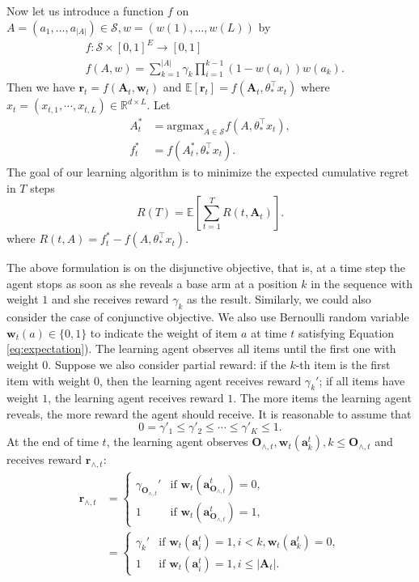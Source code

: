 \documentclass{article}
\newcommand{\EE}{\mathbb{E}}
\newcommand{\RR}{\mathbb{R}}
\newcommand{\bA}{\mathbf{A}}
\newcommand{\ba}{\mathbf{a}}
\newcommand{\bO}{\mathbf{O}}
\newcommand{\br}{\mathbf{r}}
\newcommand{\bw}{\mathbf{w}}
\newcommand{\cS}{\mathcal{S}}
\newcommand{\argmax}{\mathrm{argmax}}
\newcommand{\abs}[1]{\left| #1 \right|}
\begin{document}
Now let us introduce a function $f$ on $A = (a_1,...,a_{\abs{A}}) \in \cS, w = (w(1),...,w(L))$ by
\begin{align}
  &f : \cS \times [0,1]^E \to [0,1] \nonumber \\
  &f(A,w) = \sum_{k = 1}^{\abs{A}} \gamma_{k} \prod_{i=1}^{k-1} (1 - w(a_i)) w(a_k).
  \label{eq:functionf}
\end{align}
Then we have $\br_t = f(\bA_t, \bw_t)$ and $\EE[\br_t] = f(\bA_t, \theta_{\ast}^{\top}x_t)$ where $x_t = (x_{t,1}, \cdots, x_{t,L}) \in \RR^{d \times L}$. Let 
\begin{align*}
  A_t^{\ast} &= \argmax_{A\in \cS} f(A,\theta_{\ast}^{\top}x_t),\\
  f_t^{\ast} &= f(A_t^{\ast}, \theta_{\ast}^{\top}x_t).
\end{align*}
The goal of our learning algorithm is to minimize the expected cumulative regret in $T$ steps
$$
  R(T) = \EE\left[\sum_{t=1}^T R(t, \bA_t)\right].
$$
where $R(t, A) = f_t^{\ast} - f(A, \theta_{\ast}^{\top}x_t)$.

The above formulation is on the disjunctive objective, that is, at a time step the agent stops as soon as she reveals a base arm at a position $k$ in the sequence with weight $1$ and she receives reward $\gamma_k$ as the result. 
Similarly, we could also consider the case of conjunctive objective. 
We also use Bernoulli random variable $\bw_{t}(a) \in \{0,1\}$ to indicate the weight of item $a$ at time $t$ satisfying Equation \eqref{eq:expectation}). 
The learning agent observes all items until the first one with weight $0$. 
Suppose we also consider partial reward: if the $k$-th item is the first item with weight $0$, then the learning agent receives reward $\gamma_k'$; if all items have weight $1$, the learning agent receives reward $1$. 
The more items the learning agent reveals, the more reward the agent should receive. It is reasonable to assume that
$$
  0 = \gamma'_1 \leq \gamma'_2 \leq \cdots \leq \gamma'_K \leq 1.
$$
At the end of time $t$, the learning agent observes $\bO_{\wedge, t}, \bw_t(\ba_k^t), k \leq \bO_{\wedge, t}$ and receives reward $\br_{\wedge, t}$:
\begin{align*}
  \br_{\wedge, t} &= \begin{cases}
    \gamma_{\bO_{\wedge, t}}'  &\text{if } \bw_t(\ba_{\bO_{\wedge, t}}^t) = 0,\\
    1 &\text{if } \bw_t(\ba_{\bO_{\wedge, t}}^t) = 1,
  \end{cases}\\
  &=\begin{cases}
    \gamma_{k}'  &\text{if } \bw_t(\ba_{i}^t) = 1, i < k, \bw_t(\ba_{k}^t) = 0,\\
    1 &\text{if } \bw_t(\ba_{i}^t) = 1, i\leq \abs{\bA_t}.
  \end{cases}
\end{align*}
\end{document}
